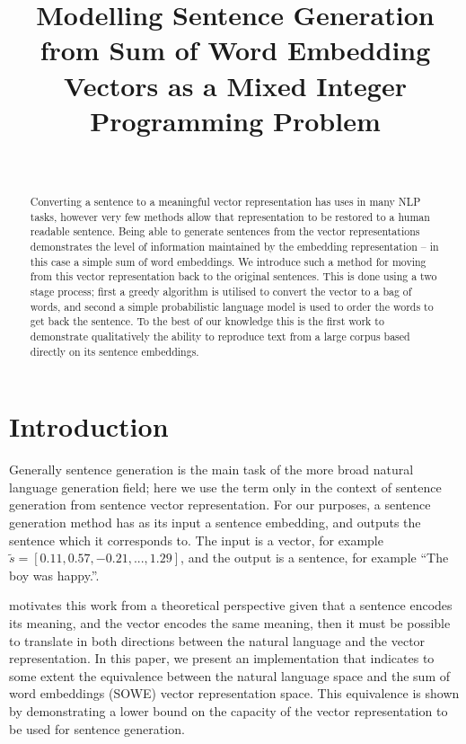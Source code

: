 \documentclass[compsoc]{IEEEtran}
\title{Modelling Sentence Generation from Sum of Word Embedding Vectors as a Mixed Integer Programming Problem}
\author{\IEEEauthorblockN{Lyndon White, Roberto Togneri, Wei Liu \and Mohammed Bennamoun}\\
	\IEEEauthorblockA{The University of Western Australia\\
		35 Stirling Highway, Crawley, Western Australia\\
		\texttt{lyndon.white@research.uwa.edu.au}\\
		\texttt{\{roberto.togneri, wei.liu, mohammed.bennamoun\}@uwa.edu.au}
		}
	}
\theoremstyle{plain}
\theoremstyle{definition}
\begin{document}
\maketitle

\begin{abstract}

	
Converting a sentence to a meaningful vector representation has uses in many NLP tasks, however very few methods allow that representation to be restored to a human readable sentence. Being able to generate sentences from the vector representations demonstrates the level of information maintained by the embedding representation -- in this case a simple sum of word embeddings. We introduce such a method for moving from this vector representation back to the original sentences. This is done using a two stage process; first a greedy algorithm is utilised to convert the vector to a bag of words, and second a simple probabilistic language model is used to order the words to get back the sentence. To the best of our knowledge this is the first work to demonstrate qualitatively the ability to reproduce text from a large corpus based directly on its sentence embeddings.
\end{abstract}

\section{Introduction} \label{intro}
Generally sentence generation is the main task of the more broad natural language generation field; here we use the term only in the context of sentence generation from sentence vector representation. For our purposes, a sentence generation method has as its input a sentence embedding, and outputs the sentence which it corresponds to. The input is a vector, for example $\tilde{s}=[0.11, 0.57,-0.21,...,1.29]$, and the output is a sentence, for example ``The boy was happy.''.

\textcite{Dinu2014CompositionalGeneration} motivates this work from a theoretical perspective given that a sentence encodes its meaning, and the vector encodes the same meaning, then it must be possible to translate in both directions between the natural language and the vector representation. In this paper, we present an implementation that indicates to some extent the equivalence between the natural language space and the sum of word embeddings (SOWE) vector representation space. This equivalence is shown by demonstrating a lower bound on the capacity of the vector representation to be used for sentence generation. 
\end{document}
